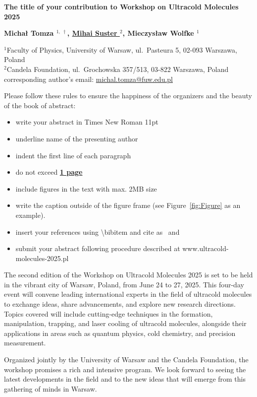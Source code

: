 \documentclass[11pt]{article}
\newcommand{\abstracttitle}[1]{
\setstretch{1.15}	%
 \begin{center}{\Large {\bf #1}}\end{center}
\setstretch{1.0}
}
\newcommand{\authors}[1]{
 \begin{center}{\bf #1} \end{center}
 \setstretch{1.0}
}
\newcommand{\addresses}[1]{
\setstretch{0.95}
 \begin{center}{\small #1} \end{center}
\setstretch{1}
}
\begin{document}
\abstracttitle{The title of your contribution to Workshop on Ultracold Molecules 2025}
\authors{
Michał Tomza $^{1,~\dag}$,
\underline{Mihai Suster $^{2}$},
Mieczysław Wolfke $^{1}$
} 

\addresses{%
$^{1}$Faculty of Physics, University of Warsaw, ul.~Pasteura 5, 02-093 Warszawa, Poland \\
$^{2}$Candela Foundation, ul.~Grochowska 357/513, 03-822 Warszawa, Poland \\
\dag corresponding author's email:  \href{mailto:michal.tomza@fuw.edu.pl}{michal.tomza@fuw.edu.pl}
}


	Please follow these rules to ensure the happiness of the organizers and the beauty of the book of abstract: 
\begin{itemize}	
\item write your abstract in Times New Roman 11pt
\item underline name of the presenting author
\item indent the first line of each paragraph
\item do not exceed \textbf{\underline{1 page}}
\item include figures in the text with max. 2MB size
\item write the caption outside of the figure frame (see Figure~\ref{fig:Figure} as an example). 
\item insert your references using \textbackslash bibitem and cite as~\cite{AuthorsAB2024} and ~\cite{AuthorsCDE2023}
\item submit your abstract following procedure described at www.ultracold-molecules-2025.pl
\end{itemize}

The second edition of the Workshop on Ultracold Molecules 2025 is set to be held in the vibrant city of Warsaw, Poland, from June 24 to 27, 2025. This four-day event will convene leading international experts in the field of ultracold molecules to exchange ideas, share advancements, and explore new research directions. Topics covered will include cutting-edge techniques in the formation, manipulation, trapping, and laser cooling of ultracold molecules, alongside their  applications in areas such as quantum physics, cold chemistry, and precision measurement.

Organized jointly by the University of Warsaw and the Candela Foundation, the workshop promises a rich  and intensive program. We look forward to seeing the latest developments in the field and to the new ideas that will emerge from this gathering of minds in Warsaw.
\end{document}
